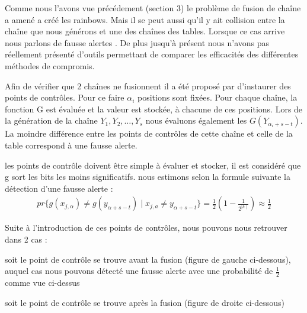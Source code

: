	Comme nous l'avons vue précédement (section 3) le problème de fusion de chaîne a amené a créé les \glspl{rainbow}. Mais il se peut aussi qu'il y ait collision entre la chaîne que nous générons et une des chaînes des tables. Lorsque ce cas arrive nous parlons de fausse alertes \cite{checkpoints}.
	De plus jusqu'à présent nous n'avons pas réellement présenté d'outils permettant de comparer les efficacités des différentes méthodes de compromis.

	Afin de vérifier que 2 chaînes ne fusionnent il a été proposé par \cite{checkpoints} d'instaurer des points de contrôles. Pour ce faire $\alpha_i$ positions sont fixées. Pour chaque chaîne, la fonction G est évaluée et la valeur est stockée, à chacune de ces positions. Lors de la génération de la chaîne $Y_1,Y_2,\ldots{},Y_s$ nous évaluons également les $G(Y_{\alpha_i+s-t})$. La moindre différence entre les points de contrôles de cette chaîne et celle de la table correspond à une fausse alerte.


	\bigskip
	
	les points de contrôle doivent être simple à évaluer et stocker, il est considéré que g sort les bits les moins significatifs. nous estimons selon la formule suivante la détection d'une fausse alerte :
\begin{align*}
pr\{g(x_{j,\alpha}) \neq g(y_{\alpha +s-t}) \mid x_{j,a} \neq y_{\alpha+s-t}\}=\frac{1}{2}(1-\frac{1}{2^{\mid k \mid}}) \approx \frac{1}{2}
\end{align*}

	Suite à l'introduction de ces points de contrôles, nous pouvons nous retrouver dans 2 cas :
	\bi
\item soit le point de contrôle se trouve avant la fusion (figure de gauche ci-dessous), auquel cas nous pouvons détecté une fausse alerte avec une probabilité de $\frac{1}{2}$ comme vue ci-dessus
\item soit le point de contrôle se trouve après la fusion (figure de droite ci-dessous)
	\ei

